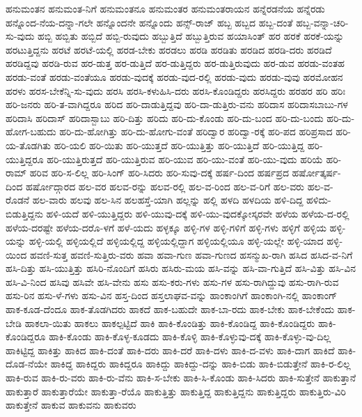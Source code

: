 {ಹನುಮಂತನ
ಹನುಮಂತ-ನಿಗೆ
ಹನುಮಂತನೂ
ಹನುಮಂತರ
ಹನುಮಂತರಾಯನ
ಹನ್ನೆರಡನೆಯ
ಹನ್ನೆರಡು
ಹನ್ನೊಂದ-ನೆಯ-ದನ್ನಾ-ಗಲೇ
ಹನ್ನೊಂದನೇ
ಹನ್ನೊಂದು
ಹನ್ಸ್-ರಾಜ್
ಹಬ್ಬ
ಹಬ್ಬದ
ಹಬ್ಬ-ದಂತೆ
ಹಬ್ಬ-ವನ್ನಾ-ಚರಿ-ಸು-ವುದು
ಹಬ್ಬಿ
ಹಬ್ಬಿತು
ಹಬ್ಬಿದೆ
ಹಬ್ಬಿ-ರುವುದು
ಹಬ್ಬುತ್ತಿದೆ
ಹಬ್ಬುತ್ತಿರುವ
ಹಯಾಸಿಂತ್
ಹರ
ಹರಕೆ
ಹರಕೆ-ಯನ್ನು
ಹರಟುತ್ತಿದ್ದನು
ಹರಟೆ
ಹರಟೆ-ಯಲ್ಲಿ
ಹರಡ-ಬೇಕು
ಹರಡಲು
ಹರಡಿ
ಹರಡಿತು
ಹರಡಿದ
ಹರಡಿ-ದರು
ಹರಡಿದೆ
ಹರಡಿದ್ದವು
ಹರಡಿ-ರುವ
ಹರ-ಡುತ್ತ
ಹರ-ಡುತ್ತಿದೆ
ಹರ-ಡುತ್ತಿದ್ದರು
ಹರ-ಡುತ್ತಿರುವುದು
ಹರ-ಡುವ
ಹರಡು-ವಂತಹ
ಹರಡು-ವಂತೆ
ಹರಡು-ವಂತೆಯೂ
ಹರಡು-ವುದಕ್ಕೆ
ಹರಡು-ವುದ-ರಲ್ಲಿ
ಹರಡು-ವುದು
ಹರಡು-ವುವು
ಹರಮೋಹನ
ಹರಳು
ಹರಸ-ಬೇಕೆನ್ನಿ-ಸು-ವುದು
ಹರಸಿ
ಹರಸಿ-ಕಳುಹಿಸಿ-ದರು
ಹರಸಿ-ಕೊಂಡಿದ್ದರು
ಹರಸಿದ್ದರು
ಹರಹರ
ಹರಿ
ಹರಿಃ
ಹರಿ-ಜನರು
ಹರಿ-ತ-ವಾಗಿದ್ದರೂ
ಹರಿದ
ಹರಿ-ದಾಡುತ್ತಿದ್ದವು
ಹರಿ-ದಾ-ಡುತ್ತಿರು-ವನು
ಹರಿದಾಸ
ಹರಿದಾಸಬಾಬು-ಗಳ
ಹರಿದಾಸಿ
ಹರಿದಾಸ್
ಹರಿದಾಸ್ಬಾಬು
ಹರಿ-ದಿತ್ತು
ಹರಿದು
ಹರಿ-ದು-ಕೊಂಡು
ಹರಿ-ದು-ಬಂದ
ಹರಿ-ದು-ಬಂದು
ಹರಿ-ದು-ಹೋಗ-ಬಹುದು
ಹರಿ-ದು-ಹೋಗಿತ್ತು
ಹರಿ-ದು-ಹೋಗು-ವಂತೆ
ಹರಿದ್ವಾರ
ಹರಿದ್ವಾ-ರಕ್ಕೆ
ಹರಿ-ಪದ
ಹರಿಪ್ರಸಾದ
ಹರಿ-ಯ-ತೊಡಗಿತು
ಹರಿ-ಯಲಿ
ಹರಿ-ಯಿತು
ಹರಿ-ಯುತ್ತದೆ
ಹರಿ-ಯುತ್ತಿತ್ತು
ಹರಿ-ಯುತ್ತಿದೆ
ಹರಿ-ಯುತ್ತಿದ್ದ
ಹರಿ-ಯುತ್ತಿದ್ದರೂ
ಹರಿ-ಯುತ್ತಿರುತ್ತದೆ
ಹರಿ-ಯುತ್ತಿರುವ
ಹರಿ-ಯುವ
ಹರಿ-ಯು-ವಂತೆ
ಹರಿ-ಯು-ವುದು
ಹರಿಯೆ
ಹರಿ-ರಾಮ್
ಹರಿವ
ಹರಿ-ಸ-ಲಿಲ್ಲ
ಹರಿ-ಸಿಂಗ್
ಹರಿ-ಸಿದರು
ಹರಿ-ಸುವು-ದಕ್ಕೆ
ಹರ್ಷ-ದಿಂದ
ಹರ್ಷಪ್ರದ
ಹರ್ಷೋತ್ಕರ್ಷ-ದಿಂದ
ಹರ್ಷೋದ್ಗಾರದ
ಹಲ-ವರ
ಹಲವ-ರನ್ನು
ಹಲವ-ರಲ್ಲಿ
ಹಲ-ವ-ರಿಂದ
ಹಲ-ವ-ರಿಗೆ
ಹಲ-ವರು
ಹಲ-ವ-ರೊಡನೆ
ಹಲ-ವಾರು
ಹಲವು
ಹಲ-ಸಿನ
ಹಲಹಸ್ತೆ-ಯಾಗಿ
ಹಲ್ಲನ್ನು
ಹಲ್ಲಿ
ಹಳದಿ
ಹಳದಿಯ
ಹಳಿ-ದಿದ್ದ
ಹಳಿದು-ಬಿಡುತ್ತಿದ್ದನು
ಹಳಿ-ಯದೆ
ಹಳಿ-ಯುತ್ತಿದ್ದರು
ಹಳಿ-ಯುವು-ದಕ್ಕೆ
ಹಳಿ-ಯು-ವುದಕ್ಕೋಸ್ಕರವೇ
ಹಳೆಯ
ಹಳೆಯ-ದ-ರಲ್ಲಿ
ಹಳೆಯ-ದರಷ್ಟೇ
ಹಳೆಯ-ದರೊ-ಳಗೆ
ಹಳೆ-ಯದು
ಹಳ್ಳಕ್ಕೂ
ಹಳ್ಳಿ-ಗಳ
ಹಳ್ಳಿ-ಗಳಿಗೆ
ಹಳ್ಳಿ-ಗಳು
ಹಳ್ಳಿಗೆ
ಹಳ್ಳಿಯ
ಹಳ್ಳಿ-ಯನ್ನು
ಹಳ್ಳಿ-ಯಲ್ಲಿ
ಹಳ್ಳಿಯಲ್ಲಿದೆ
ಹಳ್ಳಿಯಲ್ಲಿದ್ದ
ಹಳ್ಳಿಯಲ್ಲಿದ್ದಾಗ
ಹಳ್ಳಿಯಲ್ಲಿಯೂ
ಹಳ್ಳಿ-ಯಲ್ಲೇ
ಹಳ್ಳಿ-ಯಾದ
ಹಳ್ಳಿ-ಯಿಂದ
ಹವಣಿ-ಸುತ್ತ
ಹವಣಿ-ಸುತ್ತಿರು-ವರು
ಹವಾ
ಹವಾ-ಗುಣ
ಹವಾ-ಗುಣದ
ಹಸನ್ಮುಖ-ರಾಗಿ
ಹಸಿದ
ಹಸಿದ-ವ-ನಿಗೆ
ಹಸಿ-ದಿತ್ತು
ಹಸಿ-ಯುತ್ತಿತ್ತು
ಹಸಿರಿ-ನೊಂದಿಗೆ
ಹಸಿರು
ಹಸಿರು-ಮಯ
ಹಸಿ-ವನ್ನು
ಹಸಿ-ವಾ-ಗುತ್ತಿದೆ
ಹಸಿ-ವಿತ್ತು
ಹಸಿ-ವಿನ
ಹಸಿ-ವಿ-ನಿಂದ
ಹಸಿವು
ಹಸಿವೇ
ಹಸಿ-ವೇನು
ಹಸು
ಹಸು-ಕರು-ಗಳು
ಹಸು-ಗಳ
ಹಸು-ರಾಗಿದ್ದುವು
ಹಸು-ರಾಗಿ-ರುವ
ಹಸು-ರಿನ
ಹಸು-ಳೆ-ಗಳು
ಹಸು-ವಿನ
ಹಸ್ತ-ದಿಂದ
ಹಸ್ತಲಾಘವ-ವನ್ನು
ಹಾಂಕಾಂಗಿಗೆ
ಹಾಂಕಾಂಗಿ-ನಲ್ಲಿ
ಹಾಂಕಾಂಗ್
ಹಾಕ-ಕೂಡ-ದೆಂದೂ
ಹಾಕ-ತೊಡಗಿದರು
ಹಾಕದೆ
ಹಾಕ-ಬಹುದೇ
ಹಾಕ-ಬಾ-ರದು
ಹಾಕ-ಬೇಕು
ಹಾಕ-ಬೇಕೆಂದು
ಹಾಕ-ಬೇಡಿ
ಹಾಕಲಾ-ಯಿತು
ಹಾಕಲು
ಹಾಕಲ್ಪಟ್ಟಿದೆ
ಹಾಕಿ
ಹಾಕಿ-ಕೊಂಡಿತ್ತು
ಹಾಕಿ-ಕೊಂಡಿದ್ದ
ಹಾಕಿ-ಕೊಂಡಿದ್ದರು
ಹಾಕಿ-ಕೊಂಡಿದ್ದರೂ
ಹಾಕಿ-ಕೊಂಡು
ಹಾಕಿ-ಕೊಳ್ಳ-ಕೂಡದು
ಹಾಕಿ-ಕೊಳ್ಳಿ
ಹಾಕಿ-ಕೊಳ್ಳುವು-ದಕ್ಕೆ
ಹಾಕಿ-ಕೊಳ್ಳು-ವು-ದಿಲ್ಲ
ಹಾಕಿಟ್ಟಿದ್ದ
ಹಾಕಿತ್ತು
ಹಾಕಿದ
ಹಾಕಿ-ದಂತೆ
ಹಾಕಿ-ದರು
ಹಾಕಿ-ದರೆ
ಹಾಕಿ-ದಳು
ಹಾಕಿ-ದ-ವಳು
ಹಾಕಿ-ದಾಗ
ಹಾಕಿದೆ
ಹಾಕಿ-ದೊಡ-ನೆಯೇ
ಹಾಕಿದ್ದ
ಹಾಕಿದ್ದರು
ಹಾಕಿದ್ದರೂ
ಹಾಕಿದ್ದು
ಹಾಕಿದ್ದು-ದನ್ನು
ಹಾಕಿ-ಬಿಡು
ಹಾಕಿ-ಬಿಡುತ್ತೇನೆ
ಹಾಕಿ-ರ-ಲಿಲ್ಲ
ಹಾಕಿ-ರುವ
ಹಾಕಿ-ರು-ವರು
ಹಾಕಿ-ರು-ವೆನು
ಹಾಕಿ-ಸ-ಬೇಕು
ಹಾಕಿ-ಸಿ-ಕೊಂಡು
ಹಾಕಿ-ಸಿದರು
ಹಾಕಿ-ಸುತ್ತೇನೆ
ಹಾಕುತ್ತಾನೆ
ಹಾಕುತ್ತಾರೆ
ಹಾಕುತ್ತಾರೆಯೇ
ಹಾಕುತ್ತಾ-ರೆಯೊ
ಹಾಕುತ್ತಿತ್ತು
ಹಾಕುತ್ತಿದ್ದ
ಹಾಕುತ್ತಿದ್ದನು
ಹಾಕುತ್ತಿದ್ದರು
ಹಾಕುತ್ತಿರು-ವಿರಿ
ಹಾಕುತ್ತೇನೆ
ಹಾಕುವ
ಹಾಕುವನು
ಹಾಕುವರು
}
